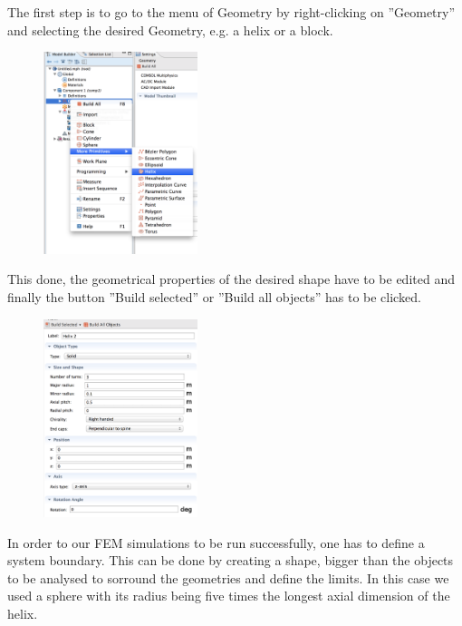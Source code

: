 The first step is to go to the menu of Geometry by right-clicking on ''Geometry'' and selecting the desired Geometry, e.g. a helix or a block.\\

\begin{figure}[H]
	\centering
  \includegraphics[width=0.4\textwidth]{Pictures/Screenshots/Sim5.png}
\end{figure}

This done, the geometrical properties of the desired shape have to be edited and finally the button ''Build selected'' or ''Build all objects'' has to be clicked.\\

\begin{figure}[H]
	\centering
  \includegraphics[width=0.4\textwidth]{Pictures/Screenshots/Sim6.png}
\end{figure}

In order to our FEM simulations to be run successfully, one has to define a system boundary. This can be done by creating a shape, bigger than the objects to be analysed to sorround the geometries and define the limits. In this case we used a sphere with its radius being five times the longest axial dimension of the helix. \\

